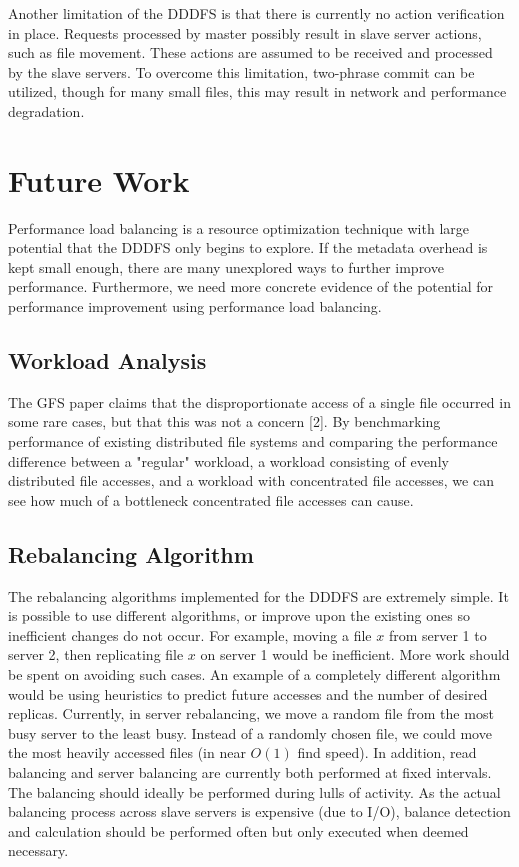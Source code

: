 \documentclass[twoside]{article}
\begin{document}
\begin{multicols}{2}
Another limitation of the DDDFS is that there is currently no action verification in place. Requests processed by master possibly result in slave server actions, such as file movement. These actions are assumed to be received and processed by the slave servers. To overcome this limitation, two-phrase commit can be utilized, though for many small files, this may result in network and performance degradation.

\section{Future Work}

Performance load balancing is a resource optimization technique with large potential that the DDDFS only begins to explore. If the metadata overhead is kept small enough, there are many unexplored ways to further improve performance. Furthermore, we need more concrete evidence of the potential for performance improvement using performance load balancing.

\subsection*{Workload Analysis}
The GFS paper claims that the disproportionate access of a single file occurred in some rare cases, but that this was not a concern [2]. By benchmarking performance of existing distributed file systems and comparing the performance difference between a "regular" workload, a workload consisting of evenly distributed file accesses, and a workload with concentrated file accesses, we can see how much of a bottleneck concentrated file accesses can cause.

\subsection*{Rebalancing Algorithm}
The rebalancing algorithms implemented for the DDDFS are extremely simple. It is possible to use different algorithms, or improve upon the existing ones so inefficient changes do not occur. For example, moving a file $x$ from server 1 to server 2, then replicating file $x$ on server 1 would be inefficient. More work should be spent on avoiding such cases. An example of a completely different algorithm would be using heuristics to predict future accesses and the number of desired replicas. Currently, in server rebalancing, we move a random file from the most busy server to the least busy. Instead of a randomly chosen file, we could move the most heavily accessed files (in near $O(1)$ find speed). In addition, read balancing and server balancing are currently both performed at fixed intervals. The balancing should ideally be performed during lulls of activity. As the actual balancing process across slave servers is expensive (due to I/O), balance detection and calculation should be performed often but only executed when deemed necessary.


\end{multicols}
\end{document}
